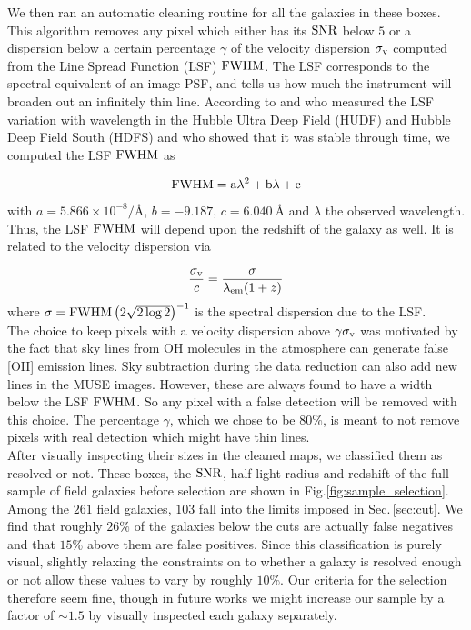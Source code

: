 We then ran an automatic cleaning routine for all the galaxies in these boxes. This algorithm removes any pixel which either has its $\rm{SNR}$ below $5$ or a dispersion below a certain percentage $\gamma$ of the velocity dispersion $\sigma_{\rm{v}}$ computed from the Line Spread Function (LSF) $\rm{FWHM}$. The LSF corresponds to the spectral equivalent of an image PSF, and tells us how much the instrument will broaden out an infinitely thin line. According to  and  who measured the LSF variation with wavelength in the Hubble Ultra Deep Field (HUDF) and Hubble Deep Field South (HDFS) and who showed that it was stable through time, we computed the LSF $\rm{FWHM}$ as

\begin{equation}
	\rm{FWHM} = a \lambda^2 + b \lambda + c
\end{equation}
with $a = 5.866 \times 10^{-8} \si{\per\angstrom}$, $b = - 9.187$, $c = \SI{6.040}{\angstrom}$ and $\lambda$ the observed wavelength. Thus, the LSF $\rm{FWHM}$ will depend upon the redshift of the galaxy as well. It is related to the velocity dispersion via

\begin{equation}
	\frac{\sigma_{\rm{v}}}{c} = \frac{\sigma}{\lambda_{\rm{em}} (1+z)}
\end{equation}
where $\sigma = \rm{FWHM} \left (2 \sqrt{2 \log 2} \right )^{-1}$ is the spectral dispersion due to the LSF. \\

The choice to keep pixels with a velocity dispersion above $\gamma \sigma_{\rm{v}}$ was motivated by the fact that sky lines from OH molecules in the atmosphere can generate false [OII] emission lines. Sky subtraction during the data reduction can also add new lines in the MUSE images. However, these are always found to have a width below the LSF $\rm{FWHM}$. So any pixel with a false detection will be removed with this choice. The percentage $\gamma$, which we chose to be $80\%$, is meant to not remove pixels with real detection which might have thin lines. \\

After visually inspecting their sizes in the cleaned maps, we classified them as resolved or not. These boxes, the $\rm{SNR}$, half-light radius and redshift of the full sample of field galaxies before selection are shown in Fig.\ref{fig:sample_selection}. Among the $261$ field galaxies, $103$ fall into the limits imposed in Sec.\,\ref{sec:cut}. We find that roughly $26\%$ of the galaxies below the cuts are actually false negatives and that $15\%$ above them are false positives. Since this classification is purely visual, slightly relaxing the constraints on to whether a galaxy is resolved enough or not allow these values to vary by roughly $10\%$. Our criteria for the selection therefore seem fine, though in future works we might increase our sample by a factor of $\sim 1.5$ by visually inspected each galaxy separately.

